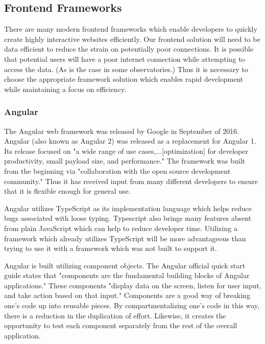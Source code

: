 \documentclass[12pt]{report}
\begin{document}
\subsection*{Frontend Frameworks}

There are many modern frontend frameworks which enable developers to quickly create highly interactive websites efficiently. Our frontend solution will need to be data efficient to reduce the strain on potentially poor connections. It is possible that potential users will have a poor internet connection while attempting to access the data. (As is the case in some observatories.) Thus it is necessary to choose the appropriate framework solution which enables rapid development while maintaining a focus on efficiency.

\subsubsection*{Angular}

The Angular web framework was released by Google in September of 2016.\cite{angularrelease} Angular (also known as Angular 2) was released as a replacement for Angular 1. Its release focused on "a wide range of use cases,...[optimization] for developer productivity, small payload size, and performance."\cite{angularrelease} The framework was built from the beginning via "collaboration with the open source development community."\cite{angularrelease} Thus it has received input from many different developers to ensure that it is flexible enough for general use.

Angular utilizes TypeScript as its implementation language which helps reduce bugs associated with loose typing. Typescript also brings many features absent from plain JavaScript which can help to reduce developer time. Utilizing a framework which already utilizes TypeScript will be more advantageous than trying to use it with a framework which was not built to support it.

Angular is built utilizing component objects. The Angular official quick start guide states that "components are the fundamental building blocks of Angular applications."\cite{angularquickstart} These components "display data on the screen, listen for user input, and take action based on that input."\cite{angularquickstart} Components are a good way of breaking one's code up into reusable pieces. By compartmentalizing one's code in this way, there is a reduction in the duplication of effort. Likewise, it creates the opportunity to test each component separately from the rest of the overall application.
\end{document}
